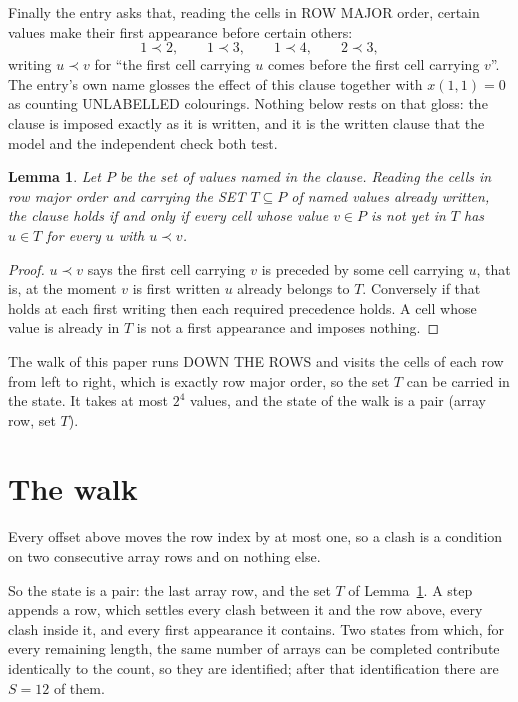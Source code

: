 \documentclass[11pt,a4paper]{article}
\theoremstyle{plain}
\newtheorem{lemma}[theorem]{Lemma}
\theoremstyle{definition}
\begin{document}
Finally the entry asks that, reading the cells in ROW MAJOR order, certain values make their
first appearance before certain others:
\[
1\prec 2,\qquad 1\prec 3,\qquad 1\prec 4,\qquad 2\prec 3 ,
\]
writing $u\prec v$ for ``the first cell carrying $u$ comes before the first cell carrying
$v$''. The entry's own name glosses the effect of this clause together with $x(1,1)=0$ as
counting UNLABELLED colourings. Nothing below rests on that gloss: the clause is imposed
exactly as it is written, and it is the written clause that the model and the independent
check both test.

\begin{lemma}\label{lem:seen}
Let $P$ be the set of values named in the clause. Reading the cells in row major order and
carrying the SET $T\subseteq P$ of named values already written, the clause holds if and only
if every cell whose value $v\in P$ is not yet in $T$ has $u\in T$ for every $u$ with $u\prec v$.
\end{lemma}

\begin{proof}
$u\prec v$ says the first cell carrying $v$ is preceded by some cell carrying $u$, that is, at
the moment $v$ is first written $u$ already belongs to $T$. Conversely if that holds at each
first writing then each required precedence holds. A cell whose value is already in $T$ is not
a first appearance and imposes nothing.
\end{proof}

The walk of this paper runs DOWN THE ROWS and visits the cells of each row from left to right,
which is exactly row major order, so the set $T$ can be carried in the state. It takes at most
$2^{4}$ values, and the state of the walk is a pair (array row, set $T$).

\section{The walk}

Every offset above moves the row index by at most one, so a clash is a condition on two
consecutive array rows and on nothing else.

So the state is a pair: the last array row, and the set $T$ of Lemma~\ref{lem:seen}. A step
appends a row, which settles every clash between it and the row above, every clash inside it,
and every first appearance it contains. Two states from which, for every remaining length, the
same number of arrays can be completed contribute identically to the count, so they are
identified; after that identification there are $S=12$ of them.
\end{document}
